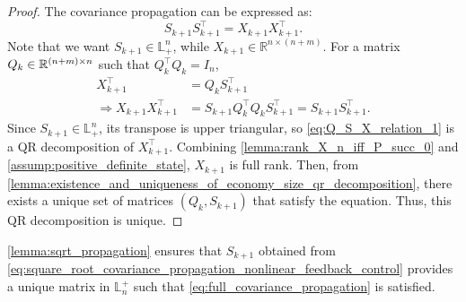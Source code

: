 \begin{proof}
The covariance propagation can be expressed as:
\begin{equation} \label{eq:covariance_propagation}
	S_{k+1} S_{k+1}^\top = X_{k+1} X_{k+1}^\top.
\end{equation}
Note that we want $S_{k+1} \in \mathbb{L}_+^n$, while $X_{k+1} \in \mathbb{R}^{n \times (n+m)}$.
For a matrix $Q_{k} \in \mathbb{R}^{(n+m) \times n}$ such that $Q_{k}^\top Q_k= I_n$,
\begin{subequations}
\begin{align}
     X_{k+1}^\top &= Q_{k} S_{k+1}^\top  \label{eq:Q_S_X_relation_1}\\
	\Rightarrow X_{k+1} X_{k+1}^\top &= S_{k+1} Q_{k}^\top Q_{k} S_{k+1}^\top = S_{k+1} S_{k+1}^\top.
\end{align}%
\label{eq:Q_S_X_relation}
\end{subequations}%
Since $S_{k+1} \in \mathbb{L}_+^n$, its transpose is upper triangular, so \cref{eq:Q_S_X_relation_1} is a QR decomposition of $X_{k+1}^\top$. 
Combining \cref{lemma:rank_X_n_iff_P_succ_0} and \cref{assump:positive_definite_state}, $X_{k+1}$ is full rank.
Then, from \cref{lemma:existence_and_uniqueness_of_economy_size_qr_decomposition}, there exists a unique set of matrices $(Q_{k}, S_{k+1})$ that satisfy the equation.
Thus, this QR decomposition is unique. 
\end{proof}
\cref{lemma:sqrt_propagation} ensures that $S_{k+1}$ obtained from \cref{eq:square_root_covariance_propagation_nonlinear_feedback_control} provides a unique matrix in $\mathbb{L}_n^+$ such that \cref{eq:full_covariance_propagation} is satisfied.

